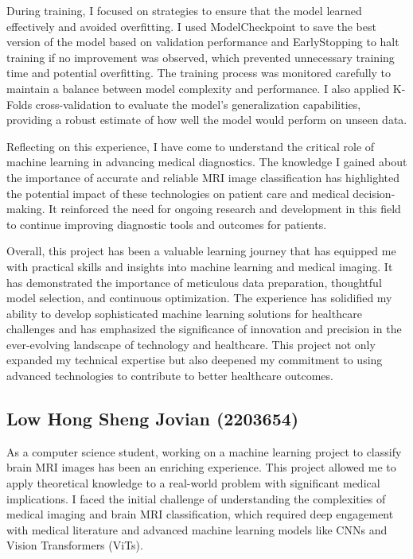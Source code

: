 During training, I focused on strategies to ensure that the model learned effectively and avoided overfitting. I used ModelCheckpoint to save the best version of the model based on validation performance and EarlyStopping to halt training if no improvement was observed, which prevented unnecessary training time and potential overfitting. The training process was monitored carefully to maintain a balance between model complexity and performance. I also applied K-Folds cross-validation to evaluate the model's generalization capabilities, providing a robust estimate of how well the model would perform on unseen data.

Reflecting on this experience, I have come to understand the critical role of machine learning in advancing medical diagnostics. The knowledge I gained about the importance of accurate and reliable MRI image classification has highlighted the potential impact of these technologies on patient care and medical decision-making. It reinforced the need for ongoing research and development in this field to continue improving diagnostic tools and outcomes for patients.

Overall, this project has been a valuable learning journey that has equipped me with practical skills and insights into machine learning and medical imaging. It has demonstrated the importance of meticulous data preparation, thoughtful model selection, and continuous optimization. The experience has solidified my ability to develop sophisticated machine learning solutions for healthcare challenges and has emphasized the significance of innovation and precision in the ever-evolving landscape of technology and healthcare. This project not only expanded my technical expertise but also deepened my commitment to using advanced technologies to contribute to better healthcare outcomes.


\subsection{Low Hong Sheng Jovian (2203654)}

As a computer science student, working on a machine learning project to classify brain MRI images has been an enriching experience. This project allowed me to apply theoretical knowledge to a real-world problem with significant medical implications. I faced the initial challenge of understanding the complexities of medical imaging and brain MRI classification, which required deep engagement with medical literature and advanced machine learning models like CNNs and Vision Transformers (ViTs).

